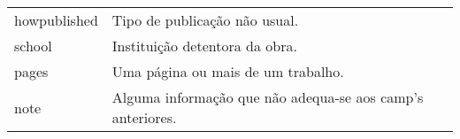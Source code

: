 \begin{tabular}{lp{}}
    \textsf{howpublished} & Tipo de publicação não usual. \\
    \textsf{school} & Instituição detentora da obra. \\
    \textsf{pages} & Uma página ou mais de um trabalho. \\
    \textsf{note} & Alguma informação que não adequa-se aos \textsf{camp}'s anteriores.
\end{tabular}
